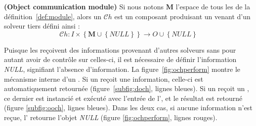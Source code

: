 
\begin{definition}\label{def:oopench} \textbf{(Object communication module)} 
Si nous notons $\mathbf{M}$ l'espace  de  tous  les \oms{} de la définition~\ref{def:module}, alors un \oopch{} $\mathcal{C}h$ est  un composant produisant un \om{}  venant d'un solveur tiers défini ainsi :
\begin{equation}
\mathcal{C}h:I\times\left\{\mathbf{M}\cup\left\{NULL\right\}\right\} \rightarrow O\cup\left\{NULL\right\}
\end{equation}
\end{definition}

Puisque les \opchs{}  reçoivent  des  informations  provenant  d'autres solveurs sans pour autant avoir de contrôle sur celles-ci, il est  nécessaire  de  définir   l'information  {\it  NULL},  signifiant l'absence  d'information.  La  figure~\ref{fig:ochperform}  montre  le mécanisme interne d'un  \opch{}. Si un \dopch{} reçoit une  information,  celle-ci   est  automatiquement  retournée  (figure~\ref{subfig:doch},  lignes bleues).  Si un  \oopch{} reçoit un \om{}, ce dernier est instancié et exécuté avec l'entrée de l'\opch, et  le résultat  est retourné  (figure \ref{subfig:ooch}, lignes bleues). Dans les deux  cas, si aucune information n'est reçue, l'\opch{}  retourne l'objet  {\it NULL}  (figure \ref{fig:ochperform}, lignes rouges).

